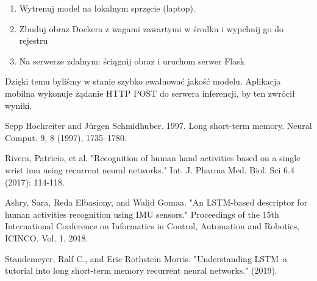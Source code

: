 \documentclass[10pt]{article}
\begin{document}
\begin{enumerate}
  \item Wytrenuj model na lokalnym sprzęcie (laptop).
  \item Zbuduj obraz Dockera z wagami zawartymi w środku i wypchnij go do rejestru
  \item Na serwerze zdalnym: ściągnij obraz i uruchom serwer Flask
\end{enumerate}

Dzięki temu byliśmy w stanie szybko ewaluować jakość modelu. Aplikacja mobilna wykonuje żądanie HTTP POST do serwera inferencji, by ten zwrócił wyniki.

\begin{thebibliography}{9}
  
  \bibitem{}
  Sepp Hochreiter and Jürgen Schmidhuber. 1997. Long short-term memory. Neural Comput. 9, 8 (1997), 1735–1780.

  \bibitem{}
  Rivera, Patricio, et al. "Recognition of human hand activities based on a single wrist imu using recurrent neural networks." Int. J. Pharma Med. Biol. Sci 6.4 (2017): 114-118.
  
  \bibitem{}
  Ashry, Sara, Reda Elbasiony, and Walid Gomaa. "An LSTM-based descriptor for human activities recognition using IMU sensors." Proceedings of the 15th International Conference on Informatics in Control, Automation and Robotics, ICINCO. Vol. 1. 2018.

  \bibitem{}
  Staudemeyer, Ralf C., and Eric Rothstein Morris. "Understanding LSTM--a tutorial into long short-term memory recurrent neural networks." (2019).
\end{thebibliography}
\end{document}
